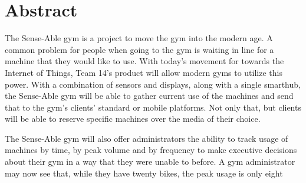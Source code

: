 \documentclass[PPFS.tex]{template/subfiles}
\begin{document}
\section*{Abstract}

The Sense-Able gym is a project to move the gym into the modern age. A common problem for people when going to the gym is waiting in line for a machine that they would like to use. With today's movement for towards the Internet of Things, Team 14's product will allow modern gyms to utilize this power. With a combination of sensors and displays, along with a single smarthub, the Sense-Able gym will be able to gather current use of the machines and send that to the gym's clients' standard or mobile platforms. Not only that, but clients will be able to reserve specific machines over the media of their choice.

The Sense-Able gym will also offer administrators the ability to track usage of machines by time, by peak volume and by frequency to make executive decisions about their gym in a way that they were unable to before. A gym administrator may now see that, while they have twenty bikes, the peak usage is only eight
\end{document}
